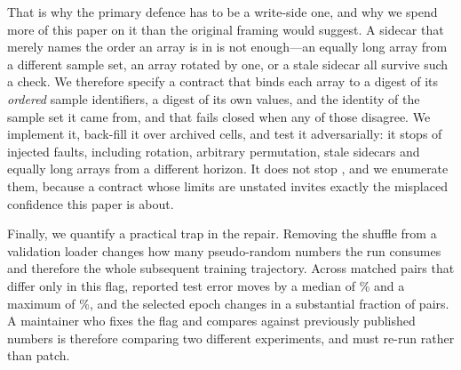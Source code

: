 \documentclass[a4paper,fleqn]{cas-sc}
\begin{document}
That is why the primary defence has to be a write-side one, and why we spend more
of this paper on it than the original framing would suggest. A sidecar that
merely names the order an array is in is not enough---an equally long array from a
different sample set, an array rotated by one, or a stale sidecar all survive such
a check. We therefore specify a contract that binds each array to a digest of its
\emph{ordered} sample identifiers, a digest of its own values, and the identity of
the sample set it came from, and that fails closed when any of those disagree. We
implement it, back-fill it over \NumBackfillDirs{} archived cells, and test it
adversarially: it stops \NumContractDetected{} of \NumContractFaults{} injected
faults, including rotation, arbitrary permutation, stale sidecars and equally long
arrays from a different horizon. It does not stop
\NumContractUndetected{}, and we enumerate them, because a contract whose
limits are unstated invites exactly the misplaced confidence this paper is about.

Finally, we quantify a practical trap in the repair. Removing the shuffle from a
validation loader changes how many pseudo-random numbers the run consumes and
therefore the whole subsequent training trajectory. Across
\NumTaxPairs{} matched pairs that differ only in this flag, reported test error
moves by a median of \NumTaxMedianAbs\% and a maximum of \NumTaxMaxAbs\%, and the
selected epoch changes in a substantial fraction of pairs. A maintainer who fixes
the flag and compares against previously published numbers is therefore comparing
two different experiments, and must re-run rather than patch.
\end{document}
